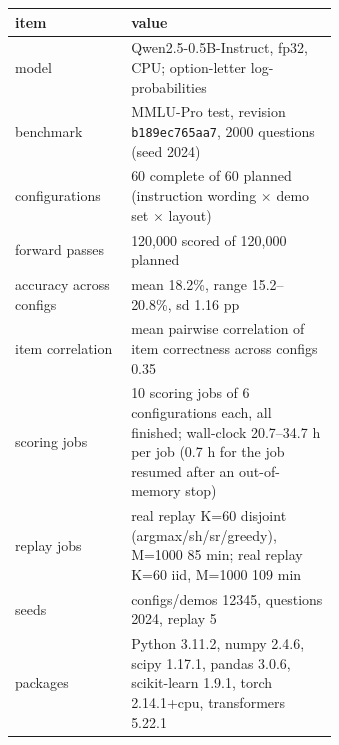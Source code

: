 {\footnotesize\setlength{\tabcolsep}{3.5pt}
\begin{tabular}{lp{0.64\linewidth}}
\toprule
item & value \\
\midrule
model & Qwen2.5-0.5B-Instruct, fp32, CPU; option-letter log-probabilities \\
benchmark & MMLU-Pro test, revision \texttt{b189ec765aa7}, 2000 questions (seed 2024) \\
configurations & 60 complete of 60 planned (instruction wording $\times$ demo set $\times$ layout) \\
forward passes & 120,000 scored of 120,000 planned \\
accuracy across configs & mean 18.2\%, range 15.2--20.8\%, sd 1.16 pp \\
item correlation & mean pairwise correlation of item correctness across configs 0.35 \\
scoring jobs & 10 scoring jobs of 6 configurations each, all finished; wall-clock 20.7--34.7 h per job (0.7 h for the job resumed after an out-of-memory stop) \\
replay jobs & real replay K=60 disjoint (argmax/sh/sr/greedy), M=1000 85 min; real replay K=60 iid, M=1000 109 min \\
seeds & configs/demos 12345, questions 2024, replay 5 \\
packages & Python 3.11.2, numpy 2.4.6, scipy 1.17.1, pandas 3.0.6, scikit-learn 1.9.1, torch 2.14.1+cpu, transformers 5.22.1 \\
\bottomrule
\end{tabular}}
